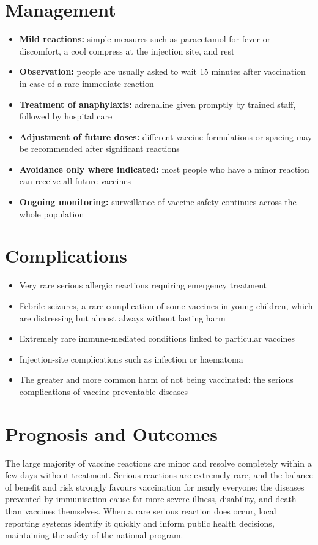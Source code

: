 \section*{Management}
\begin{itemize}
    \item \textbf{Mild reactions:} simple measures such as paracetamol for fever or discomfort, a cool compress at the injection site, and rest
    \item \textbf{Observation:} people are usually asked to wait 15 minutes after vaccination in case of a rare immediate reaction
    \item \textbf{Treatment of anaphylaxis:} adrenaline given promptly by trained staff, followed by hospital care
    \item \textbf{Adjustment of future doses:} different vaccine formulations or spacing may be recommended after significant reactions
    \item \textbf{Avoidance only where indicated:} most people who have a minor reaction can receive all future vaccines
    \item \textbf{Ongoing monitoring:} surveillance of vaccine safety continues across the whole population
\end{itemize}

\section*{Complications}
\begin{itemize}
    \item Very rare serious allergic reactions requiring emergency treatment
    \item Febrile seizures, a rare complication of some vaccines in young children, which are distressing but almost always without lasting harm
    \item Extremely rare immune-mediated conditions linked to particular vaccines
    \item Injection-site complications such as infection or haematoma
    \item The greater and more common harm of not being vaccinated: the serious complications of vaccine-preventable diseases
\end{itemize}

\section*{Prognosis and Outcomes}
The large majority of vaccine reactions are minor and resolve completely within a few days without treatment. Serious reactions are extremely rare, and the balance of benefit and risk strongly favours vaccination for nearly everyone: the diseases prevented by immunisation cause far more severe illness, disability, and death than vaccines themselves. When a rare serious reaction does occur, local reporting systems identify it quickly and inform public health decisions, maintaining the safety of the national program.

